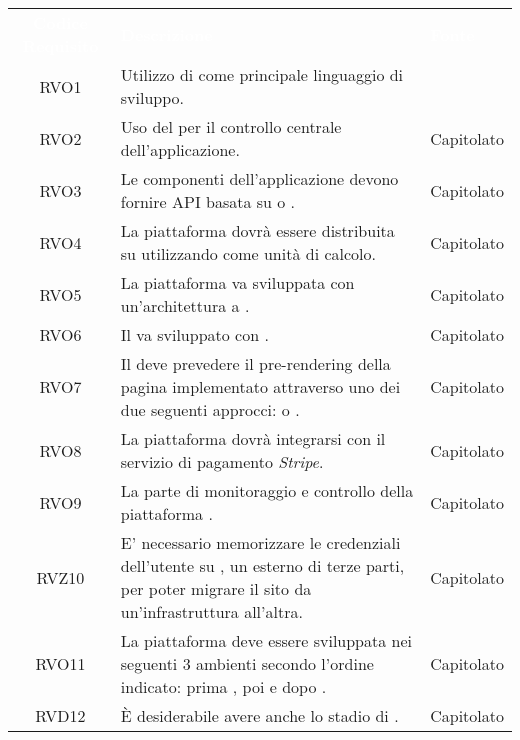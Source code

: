 \renewcommand{\arraystretch}{1.5}
\begin{longtable}{|c C{9.5cm} C{2.5cm}|} 
	
	\textcolor{white}{\textbf{Codice Requisito}}&
	\textcolor{white}{\textbf{Descrizione}}&
	\textcolor{white}{\textbf{Fonte}}\\	
	
	RVO1 & Utilizzo di  come principale linguaggio di sviluppo. &  \\
	
	RVO2 & Uso del   per il controllo centrale dell'applicazione. & Capitolato \\
	
	RVO3 & Le componenti dell'applicazione devono fornire API basata su  o . & Capitolato \\
	
	RVO4 & La piattaforma dovrà essere distribuita su  utilizzando  come unità di calcolo. & Capitolato \\
	
	RVO5 & La piattaforma va sviluppata con un'architettura a . & Capitolato \\
	
	RVO6 & Il  va sviluppato con . & Capitolato \\
	
	RVO7 & Il  deve prevedere il pre-rendering della pagina  implementato attraverso uno dei due seguenti approcci:  o . & Capitolato \\
	
	RVO8 & La piattaforma dovrà integrarsi con il servizio di pagamento \textit{Stripe}. & Capitolato \\
	
	RVO9 & La parte di monitoraggio e controllo della piattaforma . & Capitolato \\
	
	RVZ10 & E' necessario memorizzare le credenziali dell'utente su , un  esterno di terze parti, per poter migrare il sito da un'infrastruttura all'altra. & Capitolato \\
	
	RVO11 & La piattaforma deve essere sviluppata nei seguenti 3 ambienti secondo l'ordine indicato: prima , poi  e dopo . & Capitolato \\
	
	RVD12 & È desiderabile avere anche lo stadio di . & Capitolato \\
	
\end{longtable}
